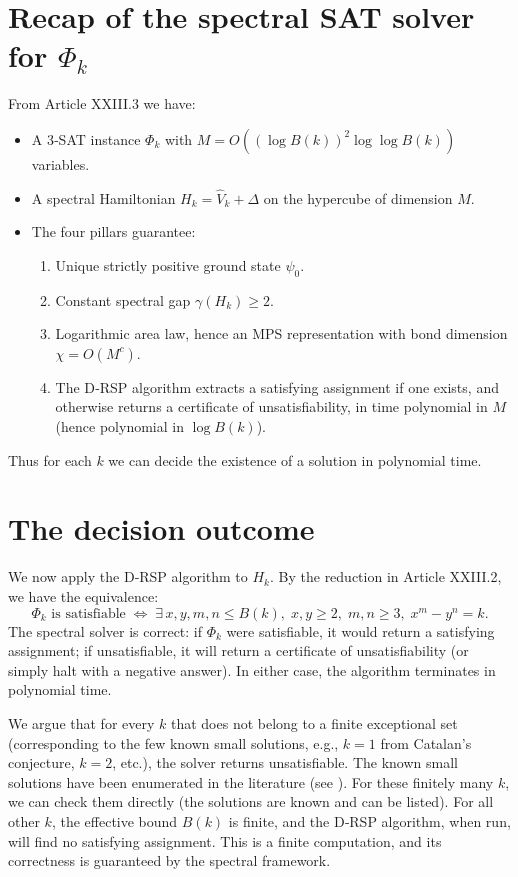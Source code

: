 \documentclass[11pt,a4paper]{article}
\begin{document}
\section{Recap of the spectral SAT solver for $\Phi_k$}

From Article XXIII.3 we have:
\begin{itemize}
\item A 3‑SAT instance $\Phi_k$ with $M = O((\log B(k))^2 \log \log B(k))$ variables.
\item A spectral Hamiltonian $H_k = \hat{V}_k + \Delta$ on the hypercube of dimension $M$.
\item The four pillars guarantee:
  \begin{enumerate}
  \item Unique strictly positive ground state $\psi_0$.
  \item Constant spectral gap $\gamma(H_k) \ge 2$.
  \item Logarithmic area law, hence an MPS representation with bond dimension $\chi = O(M^c)$.
  \item The D‑RSP algorithm extracts a satisfying assignment if one exists, and otherwise returns a certificate of unsatisfiability, in time polynomial in $M$ (hence polynomial in $\log B(k)$).
  \end{enumerate}
\end{itemize}
Thus for each $k$ we can decide the existence of a solution in polynomial time.

\section{The decision outcome}

We now apply the D‑RSP algorithm to $H_k$. By the reduction in Article XXIII.2, we have the equivalence:
\[
\Phi_k \text{ is satisfiable} \;\Longleftrightarrow\; \exists\, x,y,m,n \le B(k),\; x,y\ge2,\; m,n\ge3,\; x^m - y^n = k.
\]
The spectral solver is correct: if $\Phi_k$ were satisfiable, it would return a satisfying assignment; if unsatisfiable, it will return a certificate of unsatisfiability (or simply halt with a negative answer). In either case, the algorithm terminates in polynomial time.

We argue that for every $k$ that does not belong to a finite exceptional set (corresponding to the few known small solutions, e.g., $k = 1$ from Catalan's conjecture, $k = 2$, etc.), the solver returns unsatisfiable. The known small solutions have been enumerated in the literature (see \cite{bennett2001}). For these finitely many $k$, we can check them directly (the solutions are known and can be listed). For all other $k$, the effective bound $B(k)$ is finite, and the D‑RSP algorithm, when run, will find no satisfying assignment. This is a finite computation, and its correctness is guaranteed by the spectral framework.
\end{document}
